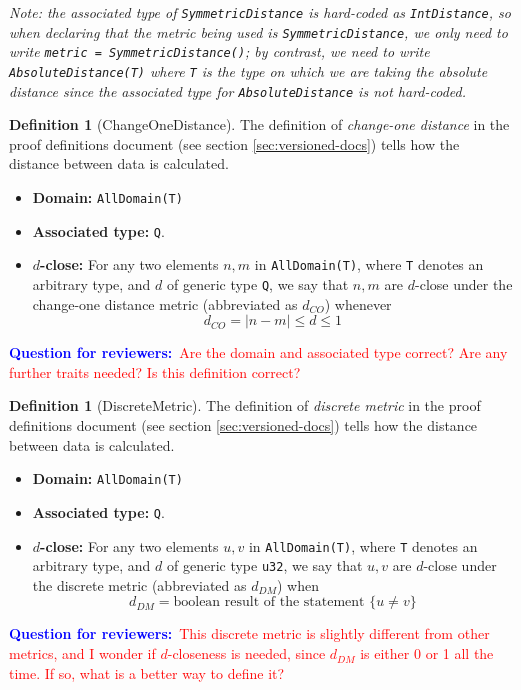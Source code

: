 \documentclass[11pt,a4paper]{article}
\theoremstyle{definition}
\newtheorem{definition}[theorem]{Definition}
\newcommand{\metricDefn}[1]{The definition of \emph{#1} in the proof definitions document (see section \ref{sec:versioned-docs}) tells how the distance between data is calculated.}
\newcommand{\questionr}[1]{\textcolor{blue}{\textbf{Question for reviewers:}}\textcolor{red}{~#1}}
\begin{document}
\emph{Note: the associated type of \texttt{SymmetricDistance} is hard-coded as \texttt{IntDistance}, so when declaring that the metric being used is \texttt{SymmetricDistance}, we only need to write \texttt{metric = SymmetricDistance()}; by contrast, we need to write \texttt{AbsoluteDistance(T)} where \texttt{T} is the type on which we are taking the absolute distance since the associated type for \texttt{AbsoluteDistance} is not hard-coded.}

\begin{definition}[ChangeOneDistance]
\metricDefn{change-one distance}

\begin{itemize}
    \item \textbf{Domain:} \texttt{AllDomain(T)}
    \item \textbf{Associated type:} \texttt{Q}.
    \item \textbf{$d$-close:} For any two elements $n, m$ in \texttt{AllDomain(T)}, where \texttt{T} denotes an arbitrary type, and $d$ of generic type \texttt{Q}, we say that $n, m$ are $d$-close under the change-one distance metric (abbreviated as $d_{CO}$) whenever
    \[
    d_{CO} = |n - m | \leq d \leq 1
    \]
\end{itemize}



\questionr{Are the domain and associated type correct? Are any further traits needed? Is this definition correct?} 

\end{definition}


\begin{definition}[DiscreteMetric]
\metricDefn{discrete metric}
\begin{itemize}
    \item \textbf{Domain:} \texttt{AllDomain(T)}
    \item \textbf{Associated type:} \texttt{Q}.
    \item \textbf{$d$-close:} For any two elements $u, v$ in \texttt{AllDomain(T)}, where \texttt{T} denotes an arbitrary type, and $d$ of generic type \texttt{u32}, we say that $u, v$ are $d$-close under the discrete metric (abbreviated as $d_{DM}$) when
    \[
    d_{DM} = \text{boolean result of the statement } \{u\neq v\}
    \]
\end{itemize}
\questionr{This discrete metric is slightly different
from other metrics, and I wonder if $d$-closeness is needed, since $d_{DM}$ is either 0 or 1 all the time.
If so, what is a better way to define it?} 
\end{definition}
\end{document}
